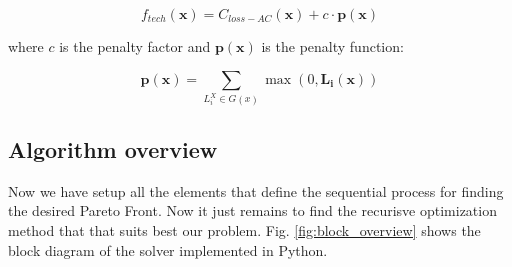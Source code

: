 \documentclass[a4paper,11pt, titlepage, twoside]{article}
\begin{document}
\begin{equation}
    f_{tech}(\mathbf{x}) = C_{loss-AC}(\mathbf{x}) + c \cdot \mathbf{p(x)}
\end{equation}

where $c$ is the penalty factor and $\mathbf{p(x)}$ is the penalty function:

\begin{equation}
    \mathbf{p(x)} = \sum_{L_i^X \in G(x)} \max(0, \mathbf{L_i(x)})
\end{equation}

\subsection{Algorithm overview}

Now we have setup all the elements that define the sequential process for finding the desired Pareto Front. Now it just remains
to find the recurisve optimization method that that suits best our problem. Fig. \ref{fig:block_overview} shows the block diagram of the solver implemented in Python.
\end{document}
